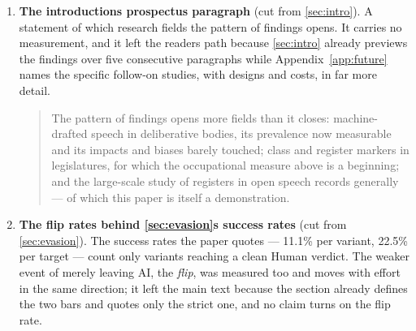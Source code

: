 \begin{enumerate}
  Two costs to state plainly. Process and timing data are themselves
  spoofable, so this is an escalation and not a resolution. And "analyse the
  student\textquotesingle s entire corpus" is a surveillance instrument before it is an
  assessment instrument; the version worth building is the one that is legible
  to the person being assessed.
\item
  \textbf{The introduction\textquotesingle s prospectus paragraph} (cut from \cref{sec:intro}). A statement of
  which research fields the pattern of findings opens. It carries no
  measurement, and it left the reader\textquotesingle s path because \cref{sec:intro} already previews the
  findings over five consecutive paragraphs while Appendix~\ref{app:future} names the
  specific follow-on studies, with designs and costs, in far more detail.

  \begin{quote}
  The pattern of findings opens more fields than it closes: machine-drafted
  speech in deliberative bodies, its prevalence now measurable and its
  impacts and biases barely touched; class and register markers in
  legislatures, for which the occupational measure above is a beginning; and
  the large-scale study of registers in open speech records generally --- of
  which this paper is itself a demonstration.
  \end{quote}
\item
  \textbf{The flip rates behind \cref{sec:evasion}\textquotesingle s success rates} (cut from \cref{sec:evasion}). The
  success rates the paper quotes --- 11.1\% per variant, 22.5\% per target ---
  count only variants reaching a clean Human verdict. The weaker event of
  merely leaving AI, the \emph{flip}, was measured too and moves with effort in
  the same direction; it left the main text because the section already
  defines the two bars and quotes only the strict one, and no claim turns on
  the flip rate.


\end{enumerate}
